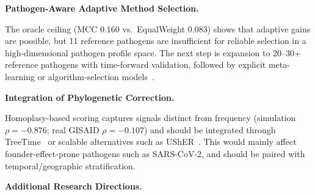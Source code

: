\begin{table}[htbp]
\centering
\caption{Prioritized future research roadmap}
\label{tab:future_roadmap}
\small
{}
\end{table}

\textbf{Pathogen-Aware Adaptive Method Selection.}

The oracle ceiling (MCC 0.160 vs.\ EqualWeight 0.083) shows that adaptive gains are possible, but 11 reference pathogens are insufficient for reliable selection in a high-dimensional pathogen profile space. The next step is expansion to 20--30+ reference pathogens with time-forward validation, followed by explicit meta-learning or algorithm-selection models~\cite{rice1976algorithm,kerschke2019algorithm}.

\textbf{Integration of Phylogenetic Correction.}

Homoplasy-based scoring captures signals distinct from frequency (simulation $\rho=-0.876$; real GISAID $\rho=-0.107$) and should be integrated through TreeTime~\cite{sagulenko2018treetime} or scalable alternatives such as UShER~\cite{turakhia2020ultrafast}.
This would mainly affect founder-effect-prone pathogens such as SARS-CoV-2, and should be paired with temporal/geographic stratification.

\textbf{Additional Research Directions.}

